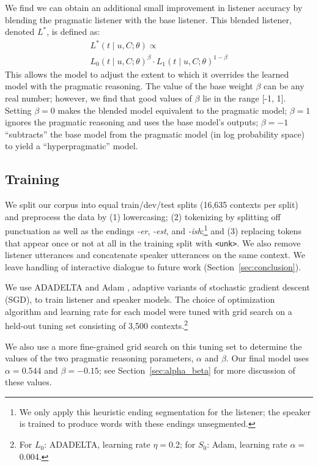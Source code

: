 \documentclass[11pt,letterpaper]{article}
\newcommand{\word}{\textit}
\newcommand{\Listener}{L}
\newcommand{\Speaker}{S}
\newcommand{\utt}{u}
\newcommand{\context}{C}
\newcommand{\target}{t}
\renewcommand{\|}{\mid}
\newcommand{\secref}[1]{Section~\ref{#1}}
\begin{document}
We find we can obtain an additional small improvement in listener accuracy
by blending the pragmatic listener with the base listener. This blended listener,
denoted $\Listener^*$, is defined as:
\begin{multline}
\Listener^{*}(\target \| \utt, \context; \theta) \propto \\ {\Listener_0}(\target \| \utt, \context; \theta)^{\beta} \cdot {}
\Listener_1(\target \| \utt, \context; \theta)^{1-\beta}  \label{eq:beta}
\end{multline}
%
This allows the model to adjust
the extent to which it overrides the learned model with the pragmatic
reasoning. The value of the base weight
$\beta$ can be any real number; however, we find that good values of $\beta$
lie in the range [-1, 1]. Setting $\beta = 0$ makes the blended model
equivalent to the pragmatic model; $\beta = 1$ ignores the
pragmatic reasoning and uses the base model's outputs; $\beta = -1$
``subtracts'' the base model from the pragmatic model (in log probability space)
to yield a ``hyperpragmatic'' model.

\subsection{Training} \label{sec:training}

We split our corpus into equal train/dev/test splits (16,635 contexts per split)
and preprocess the data by (1) lowercasing; (2) tokenizing
by splitting off punctuation as well as the endings \word{\mbox{-er}}, \word{\mbox{-est}}, and
\word{\mbox{-ish}};\footnote{We
only apply this heuristic ending segmentation for the listener; the speaker is trained to produce
words with these endings unsegmented.} and
(3) replacing tokens that appear once or not at all
in the training split with \texttt{<unk>}. We also remove
listener utterances and concatenate speaker utterances on the same context.
We leave handling of interactive dialogue to future work (\secref{sec:conclusion}).

We use ADADELTA
\cite{Zeiler2012} and Adam \cite{Kingma2014}, adaptive variants of
stochastic gradient descent (SGD), to train listener and speaker models.
The choice of optimization
algorithm and learning rate for each model were tuned with grid search
on a held-out tuning set consisting of 3,500 contexts.\footnote{For
  $\Listener_0$: ADADELTA, learning rate $\eta = {}$0.2; for
  $\Speaker_0$: Adam, learning rate $\alpha = {}$0.004.}

We also use a more fine-grained grid search on this tuning set to determine the
values of the two pragmatic reasoning parameters, $\alpha$ and $\beta$.
Our final model uses
$\alpha = 0.544$ and $\beta = -0.15$; see \secref{sec:alpha_beta} for more
discussion of these values.
\end{document}
